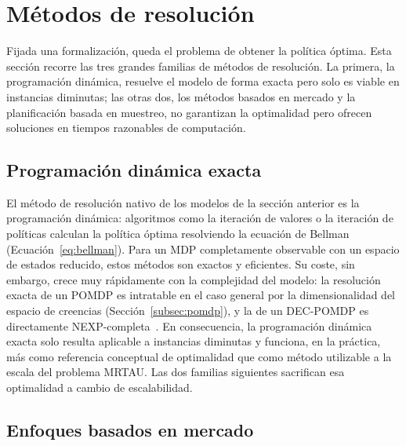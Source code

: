 \section{Métodos de resolución} \label{sec:ea-resolucion}
 
Fijada una formalización, queda el problema de obtener la política óptima. Esta sección recorre las tres grandes familias de métodos de resolución. La primera, la programación dinámica, resuelve el modelo de forma exacta pero solo es viable en instancias diminutas; las otras dos, los métodos basados en mercado y la planificación basada en muestreo, no garantizan la optimalidad pero ofrecen soluciones en tiempos razonables de computación.
 
\subsection{Programación dinámica exacta} \label{subsec:ea-dp}
 
El método de resolución nativo de los modelos de la sección anterior es la programación dinámica: algoritmos como la iteración de valores o la iteración de políticas calculan la política óptima resolviendo la ecuación de Bellman (Ecuación~\eqref{eq:bellman}). Para un MDP completamente observable con un espacio de estados reducido, estos métodos son exactos y eficientes. Su coste, sin embargo, crece muy rápidamente con la complejidad del modelo: la resolución exacta de un POMDP es intratable en el caso general por la dimensionalidad del espacio de creencias (Sección~\ref{subsec:pomdp}), y la de un DEC-POMDP es directamente NEXP-completa~\cite{bernstein2002complexity}. En consecuencia, la programación dinámica exacta solo resulta aplicable a instancias diminutas y funciona, en la práctica, más como referencia conceptual de optimalidad que como método utilizable a la escala del problema MRTAU. Las dos familias siguientes sacrifican esa optimalidad a cambio de escalabilidad.
 
\subsection{Enfoques basados en mercado} \label{subsec:ea-mercado}
 
